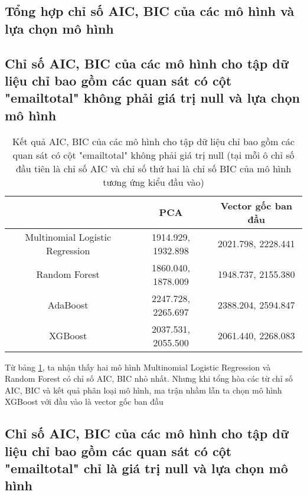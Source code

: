 \subsection{Tổng hợp chỉ số AIC, BIC của các mô hình và lựa chọn mô hình}

\subsection{Chỉ số AIC, BIC của các mô hình cho tập dữ liệu chỉ bao gồm các quan sát có cột "emailtotal" không phải giá trị null và lựa chọn mô hình}

\begin{table}[h!]
    \centering
    \begin{tabular}{|c|c|c|}
        \hline
        & PCA & Vector gốc ban đầu \\
        \hline
        Multinomial Logistic Regression & 1914.929, 1932.898 & 2021.798, 2228.441 \\
        \hline
        Random Forest & 1860.040, 1878.009 & 1948.737, 2155.380 \\
        \hline
        AdaBoost & 2247.728, 2265.697 & 2388.204, 2594.847 \\
        \hline
        XGBoost & 2037.531, 2055.500 & 2061.440, 2268.083 \\
        \hline
    \end{tabular}
    \caption{Kết quả AIC, BIC của các mô hình cho tập dữ liệu chỉ bao gồm các quan sát có cột "emailtotal" không phải giá trị null (tại mỗi ô chỉ số đầu tiên là chỉ số AIC và chỉ số thứ hai là chỉ số BIC của mô hình tương ứng kiểu đầu vào)}
    \label{tab:Non_null_AIC_BIC_Models}
\end{table}

Từ bảng \ref{tab:Non_null_AIC_BIC_Models}, ta nhận thấy hai mô hình Multinomial Logistic Regression và Random Forest có chỉ số AIC, BIC nhỏ nhất.
Nhưng khi tổng hòa các từ chỉ số AIC, BIC và kết quả phân loại mô hình, ma trận nhầm lẫn ta chọn mô hình XGBoost với đầu vào là vector gốc ban đầu


\subsection{Chỉ số AIC, BIC của các mô hình cho tập dữ liệu chỉ bao gồm các quan sát có cột "emailtotal" chỉ là giá trị null và lựa chọn mô hình}

